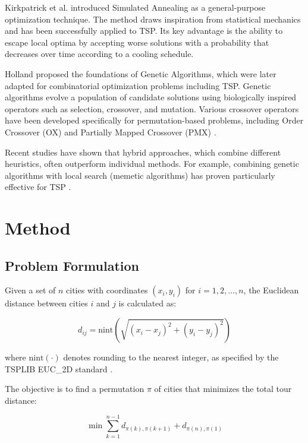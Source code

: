 \documentclass[conference]{IEEEtran}
\begin{document}
Kirkpatrick et al. \cite{kirkpatrick1983} introduced Simulated Annealing as a general-purpose optimization technique. The method draws inspiration from statistical mechanics and has been successfully applied to TSP. Its key advantage is the ability to escape local optima by accepting worse solutions with a probability that decreases over time according to a cooling schedule.

Holland \cite{holland1975} proposed the foundations of Genetic Algorithms, which were later adapted for combinatorial optimization problems including TSP. Genetic algorithms evolve a population of candidate solutions using biologically inspired operators such as selection, crossover, and mutation. Various crossover operators have been developed specifically for permutation-based problems, including Order Crossover (OX) and Partially Mapped Crossover (PMX) \cite{goldberg1989}.

Recent studies have shown that hybrid approaches, which combine different heuristics, often outperform individual methods. For example, combining genetic algorithms with local search (memetic algorithms) has proven particularly effective for TSP \cite{moscato1989}.

\section{Method}

\subsection{Problem Formulation}
Given a set of $n$ cities with coordinates $(x_i, y_i)$ for $i = 1, 2, \ldots, n$, the Euclidean distance between cities $i$ and $j$ is calculated as:

\begin{equation}
d_{ij} = \text{nint}\left(\sqrt{(x_i - x_j)^2 + (y_i - y_j)^2}\right)
\end{equation}

where $\text{nint}(\cdot)$ denotes rounding to the nearest integer, as specified by the TSPLIB EUC\_2D standard \cite{reinelt1991}.

The objective is to find a permutation $\pi$ of cities that minimizes the total tour distance:

\begin{equation}
\min \sum_{k=1}^{n-1} d_{\pi(k), \pi(k+1)} + d_{\pi(n), \pi(1)}
\end{equation}
\end{document}
